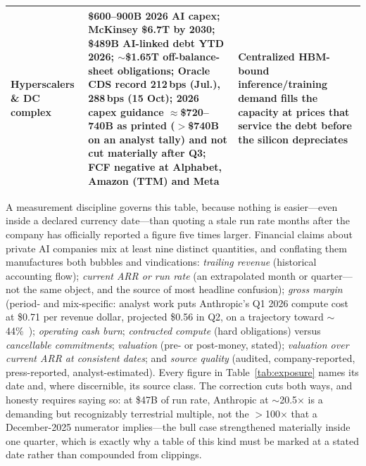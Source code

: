 \begin{table}[htbp]
\begin{tabular}{p{24mm}p{56mm}p{56mm}}
    \addlinespace
    Hyperscalers \& DC complex & \$600--900B 2026 AI capex; McKinsey \$6.7T by 2030; \$489B AI-linked debt YTD 2026; $\sim$\$1.65T off-balance-sheet obligations; Oracle CDS record 212\,bps (Jul.), 288\,bps (15 Oct); 2026 capex guidance $\approx$\$720--740B as printed ($>$\$740B on an analyst tally) and not cut materially after Q3; FCF negative at Alphabet, Amazon (TTM) and Meta~\cite{capex-2026,mckinsey-capex,ai-debt,oracle-cds,alphabet-fcf,cap-oracle-cds-oct,cap-capex-tally} & Centralized HBM-bound inference/training demand fills the capacity at prices that service the debt before the silicon depreciates \\
    \bottomrule
  \end{tabular}
\end{table}



A measurement discipline governs this table, because nothing is easier---even inside a declared currency date---than quoting a stale run rate months after the company has officially reported a figure five times larger. Financial claims about private AI companies mix at least nine distinct quantities, and conflating them manufactures both bubbles and vindications: \emph{trailing revenue} (historical accounting flow); \emph{current ARR or run rate} (an extrapolated month or quarter---not the same object, and the source of most headline confusion); \emph{gross margin} (period- and mix-specific: analyst work puts Anthropic's Q1 2026 compute cost at \$0.71 per revenue dollar, projected \$0.56 in Q2, on a trajectory toward $\sim$44\%~\cite{anthropic-margin}); \emph{operating cash burn}; \emph{contracted compute} (hard obligations) versus \emph{cancellable commitments}; \emph{valuation} (pre- or post-money, stated); \emph{valuation over current ARR at consistent dates}; and \emph{source quality} (audited, company-reported, press-reported, analyst-estimated). Every figure in Table~\ref{tab:exposure} names its date and, where discernible, its source class. The correction cuts both ways, and honesty requires saying so: at \$47B of run rate, Anthropic at $\sim$20.5$\times$ is a demanding but recognizably terrestrial multiple, not the $>$100$\times$ that a December-2025 numerator implies---the bull case strengthened materially inside one quarter, which is exactly why a table of this kind must be marked at a stated date rather than compounded from clippings.

